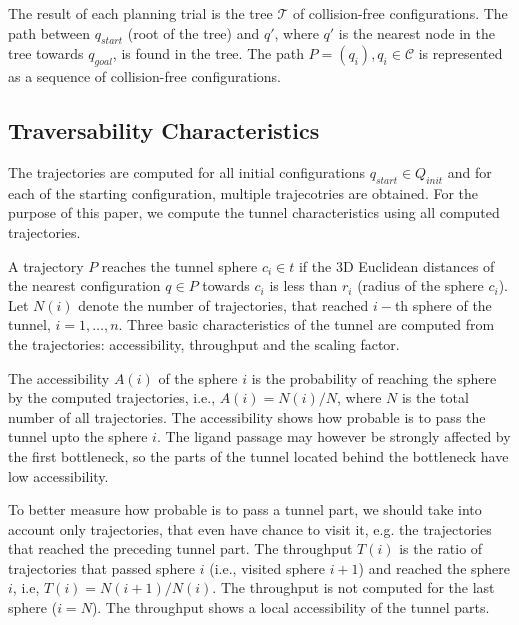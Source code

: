 \documentclass{svmult}
\def\qstart{q_{start}}
\def\qinit{\qstart}
\def\qgoal{q_{goal}}
\def\T{\mathcal{T}}
\def\C{\mathcal{C}}
\def\R{\mathbb{R}}
\def\QI{Q_{init}}
\begin{document}
The result of each planning trial is the tree $\T$ of collision-free configurations.
The path between $\qinit$ (root of the tree) and $q'$, where $q'$ is the nearest node in the tree towards $\qgoal$, is found in the tree.
The path $P=(q_i), q_i \in \C$ is represented as a sequence of collision-free configurations.



\subsection{Traversability Characteristics}

The trajectories are computed for all initial configurations $\qinit \in \QI$ and for each of the starting
configuration, multiple trajecotries are obtained.
For the purpose of this paper, we compute the tunnel characteristics using all computed trajectories.

A trajectory $P$ reaches the tunnel sphere $c_i \in t$ if the 3D Euclidean distances of the 
nearest configuration $q \in P$ towards $c_i$ is less than $r_i$ (radius of the sphere $c_i$).
Let $N(i)$ denote the number of trajectories, that reached $i-$th sphere of the tunnel, $i=1,\ldots,n$.
Three basic characteristics of the tunnel are computed from the trajectories: accessibility, throughput and the scaling factor.

The accessibility $A(i)$ of the sphere $i$ is the probability of reaching the sphere by the computed trajectories,
i.e., $A(i)=N(i) / N$, where $N$ is the total number of all trajectories.
The accessibility  shows how probable is to pass the tunnel upto the sphere $i$.
The  ligand passage may however be strongly affected by the first bottleneck, so the parts of the tunnel located behind
the bottleneck have low accessibility.

To better measure how probable is to pass a tunnel part, we should take into account only trajectories, that even have chance
to visit it, e.g. the trajectories that reached the preceding tunnel part.
The throughput $T(i)$ is the ratio of trajectories that passed sphere $i$ (i.e., visited sphere $i+1$) and reached the sphere $i$,
i.e, $T(i) = N(i+1) / N(i)$. 
The throughput is not computed for the last sphere ($i=N$).
The throughput shows a local accessibility of the tunnel parts.

\end{document}
